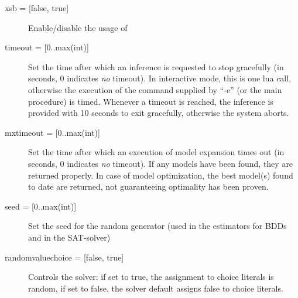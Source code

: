 \begin{description}
	\item[{xsb = [false, true]}] Enable/disable the usage of \xsb
	\item[{timeout = [0..max(int)]}] Set the time after which an inference is requested to stop gracefully (in seconds, 0 indicates \emph{no} timeout).
		In interactive mode, this is one lua call, otherwise the execution of the command supplied by ``-e'' (or the main procedure) is timed.
		Whenever a timeout is reached, the inference is provided with 10 seconds to exit gracefully, otherwise the system aborts.				
	\item[{mxtimeout = [0..max(int)]}] Set the time after which an execution of model expansion times out (in seconds, 0 indicates \emph{no} timeout).
		If any models have been found, they are returned properly.
		In case of model optimization, the best model(s) found to date are returned, not guaranteeing optimality has been proven. 
	\item[{seed = [0..max(int)]}] Set the seed for the random generator (used in the estimators for BDDs and in the SAT-solver)
	\item[{randomvaluechoice = [false, true]}] Controls the solver: if set to true, the assignment to choice literals is random, if set to false, the solver default assigns false to choice literals.
\end{description}
